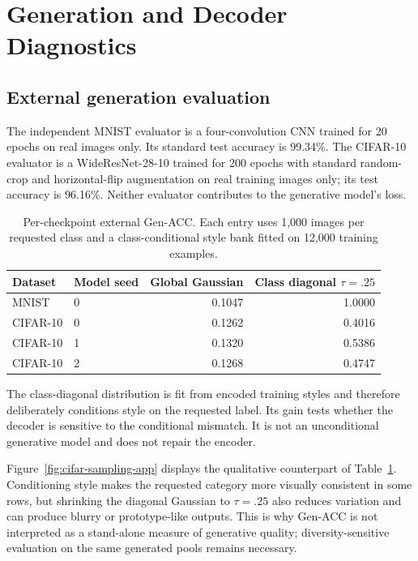 \section{Generation and Decoder Diagnostics}
\label{app:decoder}

\subsection{External generation evaluation}

The independent MNIST evaluator is a four-convolution CNN trained for 20
epochs on real images only.  Its standard test accuracy is 99.34\%.  The
CIFAR-10 evaluator is a WideResNet-28-10 trained for 200 epochs with standard
random-crop and horizontal-flip augmentation on real training images only;
its test accuracy is 96.16\%.  Neither evaluator contributes to the
generative model's loss.

\begin{table}[ht]
\caption{Per-checkpoint external Gen-ACC.  Each entry uses 1,000 images per
requested class and a class-conditional style bank fitted on 12,000 training
examples.}
\label{tab:generation-seeds}
\centering
\small
\begin{tabular}{llrr}
\toprule
Dataset & Model seed & Global Gaussian & Class diagonal $\tau=.25$ \\
\midrule
MNIST & 0 & 0.1047 & 1.0000 \\
CIFAR-10 & 0 & 0.1262 & 0.4016 \\
CIFAR-10 & 1 & 0.1320 & 0.5386 \\
CIFAR-10 & 2 & 0.1268 & 0.4747 \\
\bottomrule
\end{tabular}
\end{table}

The class-diagonal distribution is fit from encoded training styles and
therefore deliberately conditions style on the requested label.  Its gain
tests whether the decoder is sensitive to the conditional mismatch.  It is
not an unconditional generative model and does not repair the encoder.

Figure~\ref{fig:cifar-sampling-app} displays the qualitative counterpart of
Table~\ref{tab:generation-seeds}.  Conditioning style makes the requested
category more visually consistent in some rows, but shrinking the diagonal
Gaussian to $\tau=.25$ also reduces variation and can produce blurry or
prototype-like outputs.  This is why Gen-ACC is not interpreted as a
stand-alone measure of generative quality; diversity-sensitive evaluation on
the same generated pools remains necessary.

